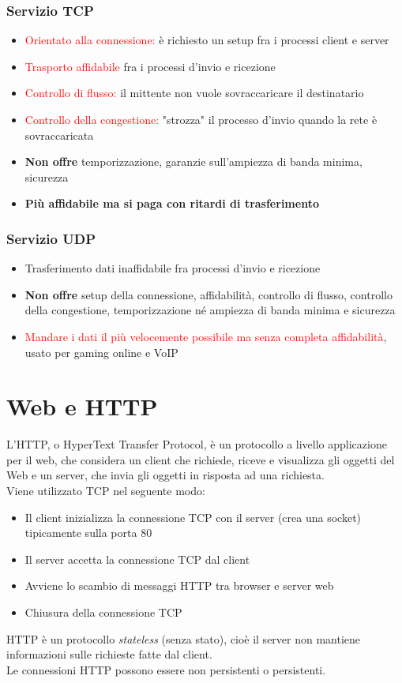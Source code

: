 \documentclass{report}
\begin{document}
	\subsubsection{Servizio TCP}
	\begin{itemize}
		\item \textcolor{red}{Orientato alla connessione:} è richiesto un setup fra i processi client e server
		\item \textcolor{red}{Trasporto affidabile} fra i processi d'invio e ricezione
		\item \textcolor{red}{Controllo di flusso:} il mittente non vuole sovraccaricare il destinatario
		\item \textcolor{red}{Controllo della congestione:} "strozza" il processo d'invio quando la rete è sovraccaricata
		\item \textbf{Non offre} temporizzazione, garanzie sull'ampiezza di banda minima, sicurezza
		\item \textbf{Più affidabile ma si paga con ritardi di trasferimento}
	\end{itemize}
	\subsubsection{Servizio UDP}
	\begin{itemize}
		\item Trasferimento dati inaffidabile fra processi d'invio e ricezione
		\item \textbf{Non offre} setup della connessione, affidabilità, controllo di flusso, controllo della congestione, temporizzazione né ampiezza di banda minima e sicurezza
		\item \textcolor{red}{Mandare i dati il più velocemente possibile ma senza completa affidabilità}, usato per gaming online e VoIP
	\end{itemize}
	\section{Web e HTTP}
	L'HTTP, o HyperText Transfer Protocol, è un protocollo a livello applicazione per il web, che considera un client che richiede, riceve e visualizza gli oggetti del Web e un server, che invia gli oggetti in risposta ad una richiesta.
	\medskip\\Viene utilizzato TCP nel seguente modo:
	\begin{itemize}
		\item Il client inizializza la connessione TCP con il server (crea una socket) tipicamente sulla porta 80
		\item Il server accetta la connessione TCP dal client
		\item Avviene lo scambio di messaggi HTTP tra browser e server web
		\item Chiusura della connessione TCP
	\end{itemize}
	HTTP è un protocollo \textit{stateless} (senza stato), cioè il server non mantiene informazioni sulle richieste fatte dal client.
	\medskip\\Le connessioni HTTP possono essere non persistenti o persistenti.
\end{document}
